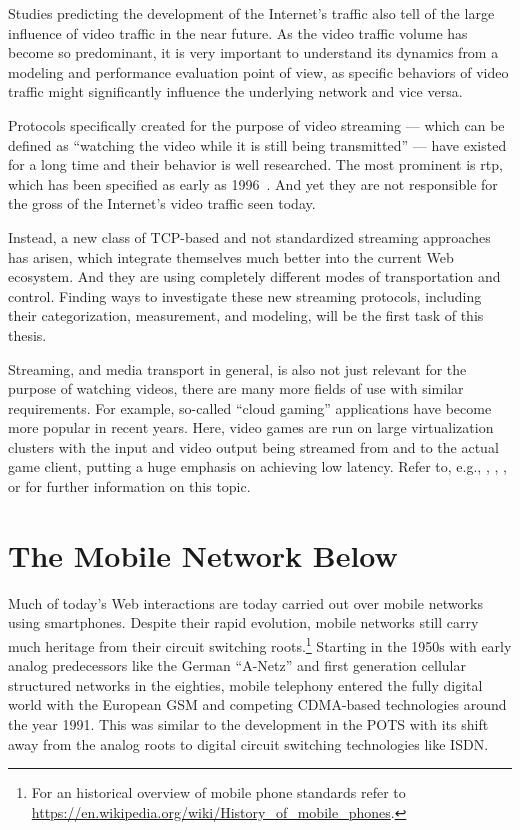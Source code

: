 Studies predicting the development of the Internet's traffic also tell of the large influence of video traffic in the near future. As the video traffic volume has become so predominant, it is very important to understand its dynamics from a modeling and performance evaluation point of view, as specific behaviors of video traffic might significantly influence the underlying network and vice versa. 

Protocols specifically created for the purpose of video streaming --- which can be defined as ``watching the video while it is still being transmitted'' --- have existed for a long time and their behavior is well researched. The most prominent is \gls{rtp}, which has been specified as early as 1996~\cite{rfc1889}. And yet they are not responsible for the gross of the Internet's video traffic seen today.

Instead, a new class of \gls{TCP}-based and not standardized streaming approaches has arisen, which integrate themselves much better into the current Web ecosystem. And they are using completely different modes of transportation and control. Finding ways to investigate these new streaming protocols, including their categorization, measurement, and modeling, will be the first task of this thesis.

Streaming, and media transport in general, is also not just relevant for the purpose of watching videos, there are many more fields of use with similar requirements. For example, so-called ``cloud gaming'' applications have become more popular in recent years. Here, video games are run on large virtualization clusters with the input and video output being streamed from and to the actual game client, putting a huge emphasis on achieving low latency. Refer to, e.g., \cite{4795441}, \cite{wang2009modeling}, \cite{jarschel2011cloudevaluation}, or \cite{ct2010wolken} for further information on this topic.


\section{The Mobile Network Below}

Much of today's Web interactions are today carried out over mobile networks using smartphones. Despite their rapid evolution, mobile networks still carry much heritage from their circuit switching roots.\footnote{For an historical overview of mobile phone standards refer to \url{https://en.wikipedia.org/wiki/History_of_mobile_phones}.}
Starting in the 1950s with early analog predecessors like the German ``A-Netz'' and first generation cellular structured networks in the eighties, mobile telephony entered the fully digital world with the European \gls{GSM} and competing \gls{CDMA}-based technologies around the year 1991. This was similar to the development in the \gls{POTS} with its shift away from the analog roots to digital circuit switching technologies like \gls{ISDN}.

